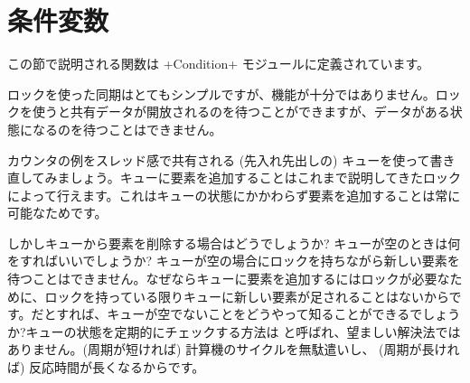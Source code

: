 \section{条件変数}

この節で説明される関数は \ml+Condition+ モジュールに定義されています。

ロックを使った同期はとてもシンプルですが、機能が十分ではありません。ロックを使うと共有データが開放されるのを待つことができますが、データがある状態になるのを待つことはできません。

カウンタの例をスレッド感で共有される (先入れ先出しの) キューを使って書き直してみましょう。キューに要素を追加することはこれまで説明してきたロックによって行えます。これはキューの状態にかかわらず要素を追加することは常に可能なためです。

しかしキューから要素を削除する場合はどうでしょうか? キューが空のときは何をすればいいでしょうか? キューが空の場合にロックを持ちながら新しい要素を待つことはできません。なぜならキューに要素を追加するにはロックが必要なために、ロックを持っている限りキューに新しい要素が足されることはないからです。だとすれば、キューが空でないことをどうやって知ることができるでしょうか?キューの状態を定期的にチェックする方法は  と呼ばれ、望ましい解決法ではありません。(周期が短ければ) 計算機のサイクルを無駄遣いし、 (周期が長ければ) 反応時間が長くなるからです。

